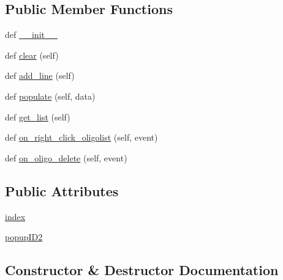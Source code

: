 \subsection*{Public Member Functions}
\begin{DoxyCompactItemize}
\item 
def \hyperlink{class_uni_dec_1_1unidec__modules_1_1masstools_1_1_oligomer_list_ctrl_aa537ce5e542f36a4aa489cc1a468a4e8}{\+\_\+\+\_\+init\+\_\+\+\_\+}
\item 
def \hyperlink{class_uni_dec_1_1unidec__modules_1_1masstools_1_1_oligomer_list_ctrl_ac1671ee165ac7afa45556da5a2e5a609}{clear} (self)
\item 
def \hyperlink{class_uni_dec_1_1unidec__modules_1_1masstools_1_1_oligomer_list_ctrl_a356a28cc77d8b42f1442b6e7181714f2}{add\+\_\+line} (self)
\item 
def \hyperlink{class_uni_dec_1_1unidec__modules_1_1masstools_1_1_oligomer_list_ctrl_a06fce2dda83f34fdc5b8e529236071d1}{populate} (self, data)
\item 
def \hyperlink{class_uni_dec_1_1unidec__modules_1_1masstools_1_1_oligomer_list_ctrl_ad8c78162ead84d676b47e6c81a8ef249}{get\+\_\+list} (self)
\item 
def \hyperlink{class_uni_dec_1_1unidec__modules_1_1masstools_1_1_oligomer_list_ctrl_ac3c6f0b0bbd734e0b9188262aee4dc1f}{on\+\_\+right\+\_\+click\+\_\+oligolist} (self, event)
\item 
def \hyperlink{class_uni_dec_1_1unidec__modules_1_1masstools_1_1_oligomer_list_ctrl_ab73e622dfad00f0c7a24b1cf9d0d9c97}{on\+\_\+oligo\+\_\+delete} (self, event)
\end{DoxyCompactItemize}
\subsection*{Public Attributes}
\begin{DoxyCompactItemize}
\item 
\hyperlink{class_uni_dec_1_1unidec__modules_1_1masstools_1_1_oligomer_list_ctrl_a72f4b0c84118680e37e76fabaca9c356}{index}
\item 
\hyperlink{class_uni_dec_1_1unidec__modules_1_1masstools_1_1_oligomer_list_ctrl_acf7edd84fb70c915724a36e0a37e4b99}{popup\+I\+D2}
\end{DoxyCompactItemize}


\subsection{Constructor \& Destructor Documentation}
\hypertarget{class_uni_dec_1_1unidec__modules_1_1masstools_1_1_oligomer_list_ctrl_aa537ce5e542f36a4aa489cc1a468a4e8}{}
